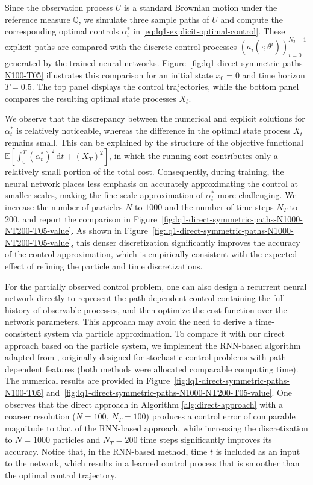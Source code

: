 \documentclass[11pt]{article}
\numberwithin{equation}{section}
\theoremstyle{plain}
\theoremstyle{definition}
\theoremstyle{remark}
\newcommand{\dd}{\mathrm{d}}
\begin{document}
	Since the observation process $U$ is a standard Brownian motion under the reference measure $\mathbb{Q}$, we simulate three sample paths of $U$ and compute the corresponding optimal controls $\alpha_t^*$ in \eqref{eq:lq1-explicit-optimal-control}. These explicit paths are compared with the discrete control processes $(a_i(\cdot;\theta^i))_{i=0}^{N_T-1}$ generated by the trained neural networks. Figure~\ref{fig:lq1-direct-symmetric-paths-N100-T05} illustrates this comparison for an initial state $x_0 = 0$ and time horizon $T=0.5$. The top panel displays the control trajectories, while the bottom panel compares the resulting optimal state processes $X_t$. 
	
		We observe that the discrepancy between the numerical and explicit solutions for $\alpha_t^*$ is relatively noticeable, whereas the difference in the optimal state process $X_t$ remains small. This can be explained by the structure of the objective functional $\mathbb{E}[\int_0^T (\alpha_t^*)^2\,\dd t + (X_T)^2]$, in which the running cost contributes only a relatively small portion of the total cost. Consequently, during training, the neural network places less emphasis on accurately approximating the control at smaller scales, making the fine-scale approximation of $\alpha_t^*$ more challenging. We increase the number of particles $N$ to $1000$ and the number of time steps $N_T$ to $200$, and report the comparison in Figure~\ref{fig:lq1-direct-symmetric-paths-N1000-NT200-T05-value}. As shown in Figure~\ref{fig:lq1-direct-symmetric-paths-N1000-NT200-T05-value}, this denser discretization significantly improves the accuracy of the control approximation, which is empirically consistent with the expected effect of refining the particle and time discretizations. 

	For the partially observed control problem, one can also design a recurrent neural network directly to represent the path-dependent control containing the full history of observable processes,  
	and then optimize the cost function over the network parameters. This approach may avoid the need to derive a time-consistent system via particle approximation. 
	To compare it with our direct approach based on the particle system, we implement the RNN-based algorithm adapted from \cite{han2021recurrent}, originally designed for stochastic control problems with path-dependent features (both methods were allocated comparable computing time).
	The numerical results are provided in Figure~\ref{fig:lq1-direct-symmetric-paths-N100-T05} and~\ref{fig:lq1-direct-symmetric-paths-N1000-NT200-T05-value}.
		One observes that the direct approach in Algorithm \ref{alg:direct-approach} with a coarser resolution ($N=100$, $N_T=100$) produces a control error of comparable magnitude to that of the RNN-based approach, while increasing the discretization to $N=1000$ particles and $N_T=200$ time steps significantly improves its accuracy.
	Notice that, in the RNN-based method, time $t$ is included as an input to the network, which results in a learned control process that is smoother than the optimal control trajectory.
\end{document}
